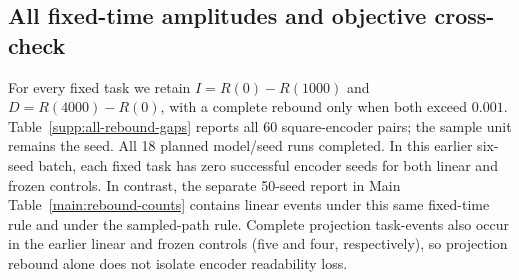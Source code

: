 \subsection{All fixed-time amplitudes and objective cross-check}
For every fixed task we retain $I=R(0)-R(1000)$ and $D=R(4000)-R(0)$, with a complete rebound only when both exceed $0.001$. Table~\ref{supp:all-rebound-gaps} reports all 60 square-encoder pairs; the sample unit remains the seed. All 18 planned model/seed runs completed. In this earlier six-seed batch, each fixed task has zero successful encoder seeds for both linear and frozen controls. In contrast, the separate 50-seed report in Main Table~\ref{main:rebound-counts} contains linear events under this same fixed-time rule and under the sampled-path rule. Complete projection task-events also occur in the earlier linear and frozen controls (five and four, respectively), so projection rebound alone does not isolate encoder readability loss.

